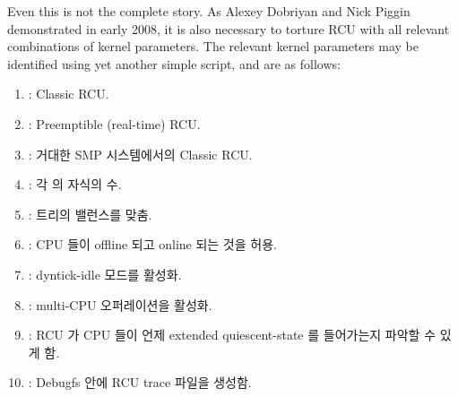 Even this is not the complete story.
As Alexey Dobriyan and Nick Piggin demonstrated in early 2008, it is
also necessary to torture RCU with all relevant combinations of kernel
parameters.
The relevant kernel parameters may be identified using yet another
simple script, and are as follows:
\fi

\begin{enumerate}
\item    {}: Classic RCU.
\item    {}: Preemptible (real-time) RCU.
\item    {}: 거대한 SMP 시스템에서의 Classic RCU.
\item    {}: 각  의 자식의 수.
\item    {}:  트리의 밸런스를 맞춤.
\item    {}: CPU 들이 offline 되고 online 되는 것을 허용.
\item    {}: dyntick-idle 모드를 활성화.
\item    {}: multi-CPU 오퍼레이션을 활성화.
\item    {}: RCU 가 CPU 들이 언제 extended
	quiescent-state 를 들어가는지 파악할 수 있게 함.
\item    {}: Debugfs 안에 RCU trace 파일을 생성함.
\iffalse

\item    \co{CONFIG_CLASSIC_RCU}: Classic RCU.
\item    \co{CONFIG_PREEMPT_RCU}: Preemptible (real-time) RCU.
\item    \co{CONFIG_TREE_RCU}: Classic RCU for huge SMP systems.
\item    \co{CONFIG_RCU_FANOUT}: Number of children for each
		\co{rcu_node}.
\item    \co{CONFIG_RCU_FANOUT_EXACT}: Balance the
		\co{rcu_node} tree.
\item    \co{CONFIG_HOTPLUG_CPU}: Allow CPUs to be offlined
		and onlined.
\item    \co{CONFIG_NO_HZ}: Enable dyntick-idle mode.
\item    \co{CONFIG_SMP}: Enable multi-CPU operation.
\item    \co{CONFIG_RCU_CPU_STALL_DETECTOR}: Enable RCU to detect
		when CPUs go on extended quiescent-state vacations.
\item    \co{CONFIG_RCU_TRACE}: Generate RCU trace files in debugfs.
\fi
\end{enumerate}

